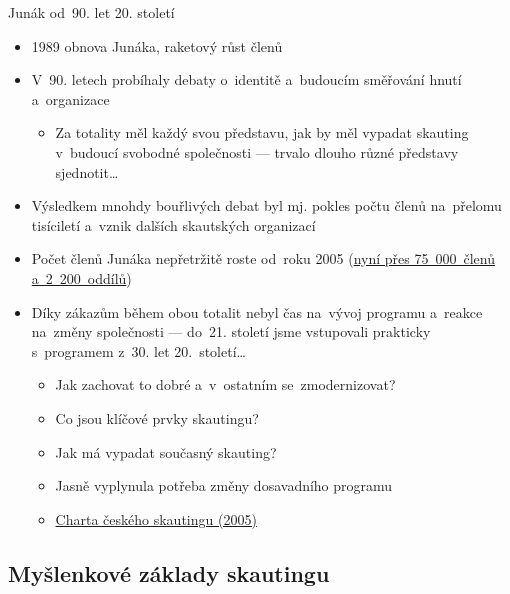 \documentclass[compress, ucs, xelatex, 11pt, xcolor=dvipsnames, print, aspectratio=169,
	hyperref={
		bookmarks=true,
		unicode=true,
		colorlinks=true,
		pdftitle={Skautska vychovna metoda},
		plainpages=false,
		pdfauthor={Vojtech Zeisek},
		pdfsubject={Skautska vychovna metoda a jeji vyvoj za posledni stoleti a desetileti},
		pdfcreator={XeLaTeX},
		pdfkeywords={Junak, Pedagogika, Skaut, Skauting, Vychovna metoda},
		linkcolor=Red, %
		anchorcolor=ForestGreen, %
		citecolor=ForestGreen, %
		filecolor=ForestGreen, %
		menucolor=ForestGreen, %
		urlcolor=Sepia, %
		pdftex},
	url={hyphens, lowtilde} %
	]{beamer}
\begin{document}
\begin{frame}{Junák od~90. let 20. století}
	\begin{itemize}
		\item 1989 obnova Junáka, raketový růst členů
		\item V~90. letech probíhaly debaty o~identitě a~budoucím směřování hnutí a~organizace
		\begin{itemize}
			\item Za totality měl každý svou představu, jak by měl vypadat skauting v~budoucí svobodné společnosti --- trvalo dlouho různé představy sjednotit\ldots
		\end{itemize}
		\item Výsledkem mnohdy bouřlivých debat byl mj. pokles počtu členů na~přelomu tisíciletí a~vznik dalších skautských organizací
		\item Počet členů Junáka nepřetržitě roste od~roku 2005 (\href{https://www.skaut.cz/skauting/fakta-a-cisla/}{nyní přes 75~000~členů a~2~200~oddílů})
		\item Díky zákazům během obou totalit nebyl čas na~vývoj programu a~reakce na~změny společnosti --- do~21. století jsme vstupovali prakticky s~programem z~30. let 20.~století\ldots
		\begin{itemize}
			\item Jak zachovat to dobré a~v~ostatním se~zmodernizovat?
			\item Co jsou klíčové prvky skautingu?
			\item Jak má vypadat současný skauting?
			\item Jasně vyplynula potřeba změny dosavadního programu
			\item \href{https://drive.google.com/file/d/1oq0Nz7ZnYIq6pac_f6G1oI8awuO9rjoz/view}{Charta českého skautingu (2005)}
		\end{itemize}
	\end{itemize}
\end{frame}

\subsection{Myšlenkové základy skautingu}
\end{document}
